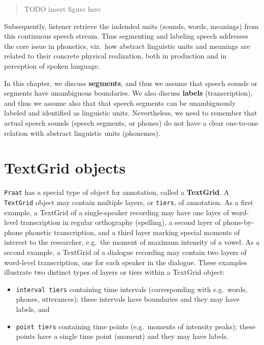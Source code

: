 \documentclass[
]{book}
\begin{document}
\begin{quote}
TODO insert figure here
\end{quote}

Subsequently, listener retrieve the indended units (sounds, words, meanings) from this continuous speech stream. Thus segmenting and labeling speech addresses the core issue in phonetics, viz.~how abstract linguistic units and meanings are related to their concrete physical realization, both in production and in perception of spoken language.

In this chapter, we discuss \textbf{segments}, and thus we assume that speech sounds or segments have unambiguous boundaries. We also discuss \textbf{labels} (transcription), and thus we assume also that that speech segments can be unambiguously labeled and identified as linguistic units. Nevertheless, we need to remember that actual speech sounds (speech segments, or phones) do not have a clear one-to-one relation with abstract linguistic units (phonemes).

\label{box-praattextgrid}
\section{TextGrid objects}\label{textgrid-objects}

\texttt{Praat} has a special type of object for annotation, called a \textbf{TextGrid}. A \texttt{TextGrid} object may contain multiple layers, or \texttt{tiers}, of annotation. As a first example, a TextGrid of a single-speaker recording may have one layer of word-level transcription in regular orthography (spelling), a second layer of phone-by-phone phonetic transcription, and a third layer marking special moments of interest to the researcher, e.g.~the moment of maximum intensity of a vowel. As a second example, a TextGrid of a dialogue recording may contain two layers of word-level transcription, one for each speaker in the dialogue. These examples illustrate two distinct types of layers or tiers within a TextGrid object:

\begin{itemize}
\item
  \texttt{interval\ tiers} containing time intervals (corresponding with e.g.~words, phones, utterances); these intervals have boundaries and they may have labels, and
\item
  \texttt{point\ tiers} containing time points (e.g.~moments of intensity peaks); these points have a single time point (moment) and they may have labels.
\end{itemize}
\end{document}
